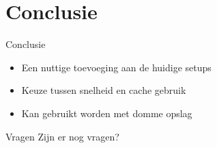 \documentclass[xcolor=svgnames]{beamer}
\begin{document}
\section{Conclusie}

\begin{frame}{Conclusie}
  \begin{itemize}
      \item Een nuttige toevoeging aan de huidige setups
      \item Keuze tussen snelheid en cache gebruik
      \item Kan gebruikt worden met domme opslag
  \end{itemize}
\end{frame}


\begin{frame}{Vragen}
    Zijn er nog vragen?


\end{frame}
\end{document}
